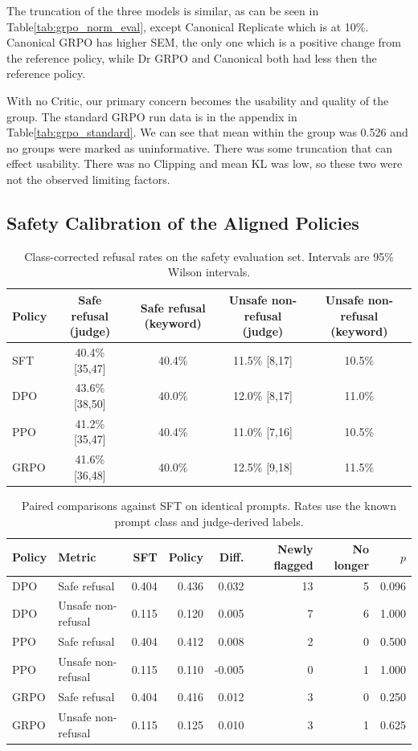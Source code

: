 \documentclass{article}
\begin{document}
The truncation of the three models is similar, as can be seen in Table\ref{tab:grpo_norm_eval}, except Canonical Replicate which is at 10\%. Canonical GRPO has higher SEM, the only one which is a positive change from the reference policy,
while Dr GRPO and Canonical both had less then the reference policy.

With no Critic, our primary concern becomes the usability and quality of the group. The standard GRPO run data is in the appendix in Table\ref{tab:grpo_standard}. We can see that mean within the group was 0.526 and no groups were marked as
uninformative. There was some truncation that can effect usability. There was no Clipping and mean KL was low, so these two were not the observed limiting factors.

\subsection{Safety Calibration of the Aligned Policies}

\begin{table}[t]
\centering
\small
\caption{Class-corrected refusal rates on the safety evaluation set.
Intervals are 95\% Wilson intervals.}
\label{tab:t4-corrected}
\begin{tabular}{lcccc}
\toprule
Policy
& Safe refusal (judge)
& Safe refusal (keyword)
& Unsafe non-refusal (judge)
& Unsafe non-refusal (keyword) \\
\midrule
SFT  & 40.4\% [35,47] & 40.4\% & 11.5\% [8,17] & 10.5\% \\
DPO  & 43.6\% [38,50] & 40.0\% & 12.0\% [8,17] & 11.0\% \\
PPO  & 41.2\% [35,47] & 40.4\% & 11.0\% [7,16] & 10.5\% \\
GRPO & 41.6\% [36,48] & 40.0\% & 12.5\% [9,18] & 11.5\% \\
\bottomrule
\end{tabular}
\end{table}

\begin{table}[t]
\centering
\small
\caption{Paired comparisons against SFT on identical prompts.
Rates use the known prompt class and judge-derived labels.}
\label{tab:t4-paired}
\begin{tabular}{llrrrrrr}
\toprule
Policy & Metric & SFT & Policy & Diff.
& Newly flagged & No longer & $p$ \\
\midrule
DPO & Safe refusal       & 0.404 & 0.436 & 0.032 & 13 & 5 & 0.096 \\
DPO & Unsafe non-refusal & 0.115 & 0.120 & 0.005 & 7  & 6 & 1.000 \\
PPO & Safe refusal       & 0.404 & 0.412 & 0.008 & 2  & 0 & 0.500 \\
PPO & Unsafe non-refusal & 0.115 & 0.110 & -0.005 & 0 & 1 & 1.000 \\
GRPO & Safe refusal      & 0.404 & 0.416 & 0.012 & 3  & 0 & 0.250 \\
GRPO & Unsafe non-refusal& 0.115 & 0.125 & 0.010 & 3  & 1 & 0.625 \\
\bottomrule
\end{tabular}
\end{table}
\end{document}
